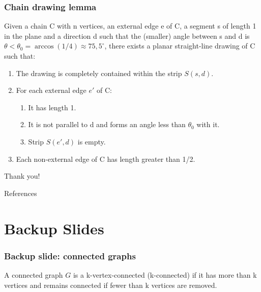 \documentclass[xetex,mathserif,serif]{beamer}
\begin{document}
\begin{frame}
  \frametitle{Chain drawing lemma}
  \begin{lemma}
    Given a chain C with n vertices, an external edge e of C, a segment s of length 1 in the plane and a direction d such that the (smaller) angle between s and d is \(\theta < \theta_0 = \arccos(1/4)\approx 75,5^{\circ}\), there exists a planar straight-line drawing of C such that:
    \begin{enumerate}
    \item The drawing is completely contained within the strip \(S(s, d)\).
    \item For each external edge \(e'\) of C:
      \begin{enumerate}
      \item It has length 1.
      \item It is not parallel to d and forms an angle less than \(\theta_0\) with it.
      \item Strip \(S(e', d)\) is empty.
      \end{enumerate}
    \item Each non-external edge of C has length greater than 1/2.
    \end{enumerate}
  \end{lemma}
\end{frame}

\begin{frame}[standout]
  Thank you!
\end{frame}

\begin{frame}[fragile]{References}
\printbibliography
\end{frame}

\appendix

\section{Backup Slides}

\begin{frame}
  \frametitle{Backup slide: connected graphs}

  \begin{definition}
    A connected graph \(G\) is a k-vertex-connected (k-connected) if it has more than k vertices and remains connected if fewer than k vertices are removed.
  \end{definition}
\end{frame}
\end{document}
